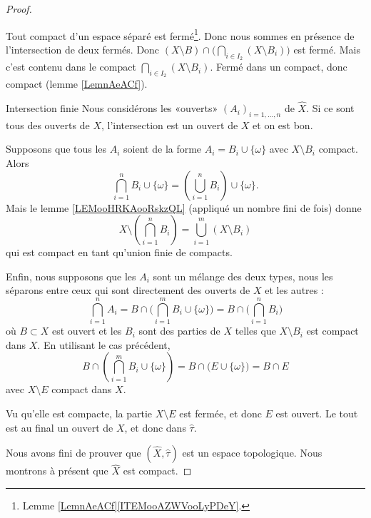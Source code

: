 \begin{proof}
\begin{subproof}
            Tout compact d'un espace séparé est fermé\footnote{Lemme \ref{LemnAeACf}\ref{ITEMooAZWVooLyPDeY}.}. Donc nous sommes en présence de l'intersection de deux fermés. Donc
            $(X\setminus B)\cap\big( \bigcap_{i\in I_2}(X\setminus B_i) \big)$ est fermé. Mais c'est contenu dans le compact \( \bigcap_{i\in I_2}(X\setminus B_i)\). Fermé dans un compact, donc compact (lemme \ref{LemnAeACf}).
        \item[Intersection finie]
            Nous considérons les «ouverts» \( (A_i)_{i=1,\ldots, n}\) de \( \hat X\). Si ce sont tous des ouverts de \( X\), l'intersection est un ouvert de \( X\) et on est bon.

            Supposons que tous les \( A_i\) soient de la forme \( A_i=B_i\cup\{ \omega \}\) avec \( X\setminus B_i\) compact. Alors
            \begin{equation}
                \bigcap_{i=1}^nB_i\cup\{ \omega \}=\left( \bigcup_{i=1}^nB_i \right)\cup\{ \omega \}.
            \end{equation}
            Mais le lemme \ref{LEMooHRKAooRskzQL} (appliqué un nombre fini de fois) donne
            \begin{equation}
                X\setminus\left( \bigcap_{i=1}^nB_i \right)=\bigcup_{i=1}^m(X\setminus B_i)
            \end{equation}
            qui est compact en tant qu'union finie de compacts.

            Enfin, nous supposons que les \( A_i\) sont un mélange des deux types, nous les séparons entre ceux qui sont directement des ouverts de \( X\) et les autres :
            \begin{equation}
                \bigcap_{i=1}^nA_i=B\cap\big( \bigcap_{i=1}^mB_i\cup\{ \omega \} \big)=B\cap\big( \bigcap_{i=1}^nB_i \big)
            \end{equation}
            où \( B\subset X\) est ouvert et les \( B_i\) sont des parties de \( X\) telles que \( X\setminus B_i\) est compact dans \( X\). En utilisant le cas précédent,
            \begin{equation}
                B\cap\left( \bigcap_{i=1}^mB_i\cup\{ \omega \} \right)=B\cap\big( E\cup\{ \omega \} \big)=B\cap E
            \end{equation}
            avec \( X\setminus E\) compact dans \( X\).

            Vu qu'elle est compacte, la partie \( X\setminus E\) est fermée, et donc \( E\) est ouvert. Le tout est au final un ouvert de \( X\), et donc dans \( \hat\tau\).
    \end{subproof}
    Nous avons fini de prouver que \( (\hat X, \hat \tau)\) est un espace topologique. Nous montrons à présent que \( \hat X\) est compact.


\end{proof}

